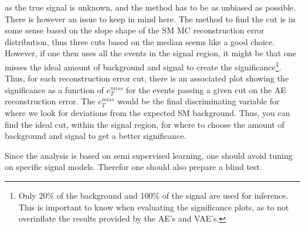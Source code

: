 as the true signal is unknown, and the method has to be as unbiased as possible. There is however an issue to keep 
in mind here. The method to find the cut is in some sense based on the slope shape of the SM MC reconstruction 
error distribution, thus three cuts based on the median seems like a good choice. However, if one then uses all 
the events in the signal region, it might be that one misses the ideal amount of background and signal to create 
the significance\footnote{Only 20\% of the background and 100\% of the signal are used for inference. This is important 
to know when evaluating the significance plots, as to not overinflate the results provided by the AE's and VAE's.}. Thus, for each reconstruction error cut, there is an associated plot showing the significance 
as a function of $e_T^{miss}$ for the events passing a given cut on the AE reconstruction error. The $e_T^{miss}$
would be the final discriminating variable for where we look for deviations from the expected SM background. 
Thus, you can find the ideal cut, within the signal region, for where to 
choose the amount of background and signal to get a better significance.\par 
Since the analysis is based on semi supervised learning, one should avoid tuning on specific signal models.
Therefor one should also prepare a blind test. 

